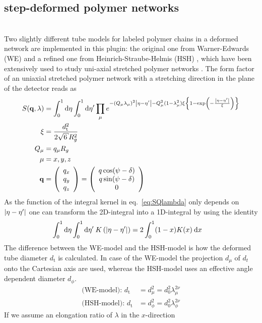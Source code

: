 \subsection{step-deformed polymer networks}
\label{sect:DeformedPolymerNetwork}
\hspace{1pt}\\
Two slightly different tube models for labeled polymer chains in a deformed network are implemented in this plugin: the original one from Warner-Edwards (WE) \cite{Warner1978} and a refined one from Heinrich-Straube-Helmis (HSH) \cite{Heinrich1988}, which have been extensively used to study uni-axial stretched polymer networks \cite{Straube1995,Mergell2001,Westermann2001,Westermann1999,Westermann1996,Read1997}.
The form factor of an uniaxial stretched polymer network with a stretching direction in the plane of the detector reads as
\begin{align}
\label{eq:SQlambda}
S(\mathbf{q},\lambda) &= \int_0^1\mathrm{d}\eta \int_0^1 \mathrm{d}\eta' \prod_{\mu} e^{-\left(Q_\mu\lambda_\mu\right)^2\abs{\eta-\eta'}-Q_\mu^2(1-\lambda_\mu^2)\xi\left\{1-\exp\left(-\frac{\abs{\eta-\eta'}}{\xi}\right)\right\}} \\
\xi &= \frac{d_\mathrm{t}^2}{2\sqrt{6}R_g^2} \\
Q_\mu &= q_\mu R_g\\
\mu  &= x,y,z \\
\mathbf{q} &= \Vek{q_x}{q_y}{q_z} = \Vek{q \cos(\psi-\delta)}{q\sin(\psi-\delta)}{0}
\end{align}
As the function of the integral kernel in eq.\ \ref{eq:SQlambda} only depends on $\abs{\eta-\eta'}$ one can transform the 2D-integral into a 1D-integral by using the identity
\begin{align}
\label{eq:2D1D_int_identity}
\int_0^1\mathrm{d}\eta \int_0^1 \mathrm{d}\eta' \: K\left(\abs{\eta-\eta'}\right) &= 2 \int_0^1 (1-x)K(x)\: \mathrm{d}x
\end{align}
The difference between the WE-model and the HSH-model is how the deformed tube diameter $d_\mathrm{t}$ is calculated. In case of the WE-model the projection $d_\mu$ of $d_t$ onto the Cartesian axis are used, whereas the HSH-model uses an effective angle dependent diameter $d_\phi$.
\begin{align}
\mbox{(WE-model): } d_\mathrm{t} &= d_\mu^2 = d_0^2\lambda_\mu^{2\nu} \\
\mbox{(HSH-model): } d_\mathrm{t} &= d_\phi^2 = d_0^2\lambda_\phi^{2\nu}
\end{align}
If we assume an elongation ratio of $\lambda$ in the $x$-direction
